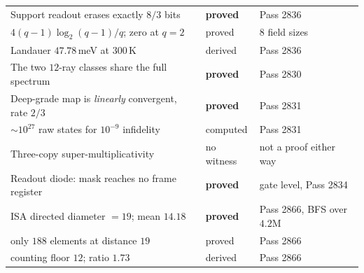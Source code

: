 \documentclass[11pt,a4paper]{article}
\begin{document}
{\begin{center}
\begin{tabular}{@{}p{8.4cm}p{2.4cm}p{3.9cm}@{}}
Support readout erases exactly $8/3$ bits & \textbf{proved} & Pass 2836\\
\quad $4(q{-}1)\log_2(q{-}1)/q$; zero at $q{=}2$ & proved & 8 field sizes\\
\quad Landauer $47.78$\,meV at $300$\,K & derived & Pass 2836\\
The two $12$-ray classes share the full spectrum & \textbf{proved} & Pass 2830\\
Deep-grade map is \emph{linearly} convergent, rate $2/3$ & \textbf{proved} & Pass 2831\\
\quad $\sim10^{27}$ raw states for $10^{-9}$ infidelity & computed & Pass 2831\\
Three-copy super-multiplicativity & \textcolor{bad}{no witness} & not a proof either way\\
Readout diode: mask reaches no frame register & \textbf{proved} & gate level, Pass 2834\\
ISA directed diameter $=19$; mean $14.18$ & \textbf{proved} & Pass 2866, BFS over $4.2$M\\
\quad only $188$ elements at distance $19$ & proved & Pass 2866\\
\quad counting floor $12$; ratio $1.73$ & derived & Pass 2866\\
\bottomrule
\end{tabular}
\end{center}}

\end{document}

